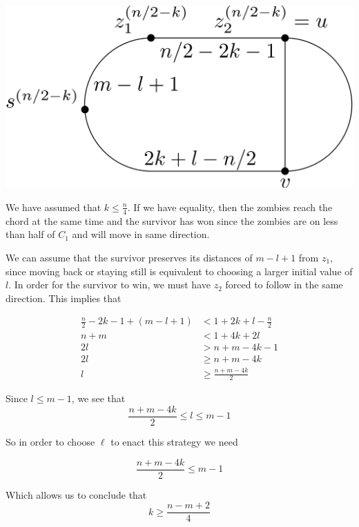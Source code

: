 \documentclass[letterpaper, 10pt]{article}
\begin{document}
\begin{enumerate}
       \begin{center}
        \includegraphics[scale=0.15]{diagramCaseB1_2}
       \end{center}

       We have assumed that $k \leq \frac{n}{4}$. If we have equality, then the zombies reach
       the chord at the same time and the survivor has won since the zombies are on less than half
       of $C_1$ and will move in same direction.

       We can assume that the survivor preserves its distances of $m-l+1$ from $z_1$,
       since moving back or staying still is equivalent to choosing a larger initial value of $l$.
       In order for the survivor to win, we must have $z_2$ forced to follow in the same direction.
       This implies that

       \begin{align*}
        \frac{n}{2} -2k -1 + (m-l+1) & < 1 + 2k + l - \frac{n}{2} \\
        n+m                          & < 1 + 4k + 2l              \\
        2l                           & > n+m - 4k -1              \\
        2l                           & \geq n+m -4k               \\
        l                            & \geq \frac{n+m-4k}{2}
       \end{align*}

       Since $l \leq m -1$, we see that
       \[ \frac{n+m-4k}{2} \leq l \leq m-1 \]

       So in order to choose $\ell$ to enact this strategy we need

       \[ \frac{n+m-4k}{2} \leq m-1 \]

       Which allows us to conclude that
       \[ k \geq \frac{n-m+2}{4} \]


\end{enumerate}
\end{document}

